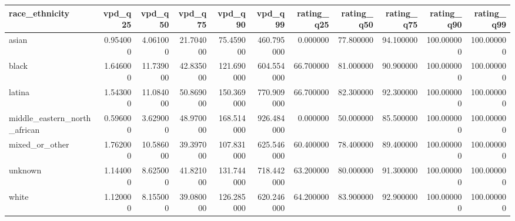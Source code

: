 \begin{tabular}{lrrrrrrrrrr}
\toprule
race_ethnicity & vpd_q25 & vpd_q50 & vpd_q75 & vpd_q90 & vpd_q99 & rating_q25 & rating_q50 & rating_q75 & rating_q90 & rating_q99 \\
\midrule
asian & 0.954000 & 4.061000 & 21.704000 & 75.459000 & 460.795000 & 0.000000 & 77.800000 & 94.100000 & 100.000000 & 100.000000 \\
black & 1.646000 & 11.739000 & 42.835000 & 121.690000 & 604.554000 & 66.700000 & 81.000000 & 90.900000 & 100.000000 & 100.000000 \\
latina & 1.543000 & 11.084000 & 50.869000 & 150.369000 & 770.909000 & 66.700000 & 82.300000 & 92.300000 & 100.000000 & 100.000000 \\
middle_eastern_north_african & 0.596000 & 3.629000 & 48.970000 & 168.514000 & 926.484000 & 0.000000 & 50.000000 & 85.500000 & 100.000000 & 100.000000 \\
mixed_or_other & 1.762000 & 10.586000 & 39.397000 & 107.831000 & 625.546000 & 60.400000 & 78.400000 & 89.400000 & 100.000000 & 100.000000 \\
unknown & 1.144000 & 8.625000 & 41.821000 & 131.744000 & 718.442000 & 63.200000 & 80.000000 & 91.300000 & 100.000000 & 100.000000 \\
white & 1.120000 & 8.155000 & 39.080000 & 126.285000 & 620.246000 & 64.200000 & 83.900000 & 92.900000 & 100.000000 & 100.000000 \\
\bottomrule
\end{tabular}
